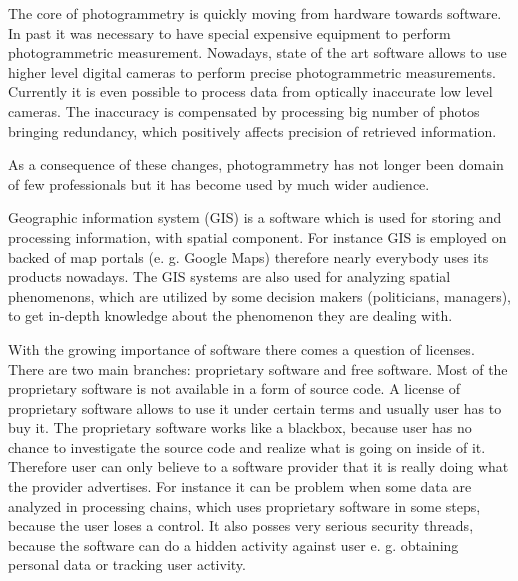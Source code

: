 \documentclass[a4paper,12pt]{article}
\begin{document}

The core of photogrammetry is quickly moving  from  hardware towards software. In past it was necessary to have special 
expensive equipment to perform photogrammetric measurement. Nowadays,
 state of the art software allows to use higher level digital cameras to perform precise photogrammetric measurements. 
 Currently it is even possible to process data from optically inaccurate low level cameras.
 The inaccuracy is compensated by processing big number of photos bringing redundancy, 
 which positively affects precision of retrieved information.
 
As a consequence of these changes, photogrammetry has not longer been domain of few professionals but it has 
become used by much wider audience. 


Geographic information system (GIS) is a software which is used for storing and processing information,
with spatial component. For instance  GIS is employed on backed of map portals (e. g. Google Maps) therefore nearly 
everybody uses its products nowadays. 
The GIS systems are also used for analyzing spatial phenomenons, which
are utilized by some decision makers (politicians, managers), to get in-depth knowledge about the 
phenomenon they are dealing with.



With the growing importance of software there comes a question of licenses. There are two 
main branches: proprietary software and free software. Most of the proprietary software is not available in 
a form of source code. A license of proprietary software allows to use it under certain terms and usually user 
has to buy it. The proprietary software works like a blackbox, because user has no chance to investigate the source 
code and realize what is going on inside of it. Therefore user can only believe to a software provider
that it is really doing what the provider advertises. 
For instance it can be problem when some data are analyzed in processing chains, which uses proprietary software in some steps,
because the user loses a control.
It also posses very serious security threads, because the software can do a hidden activity against user
e. g. obtaining personal data or tracking user activity.
\end{document}
